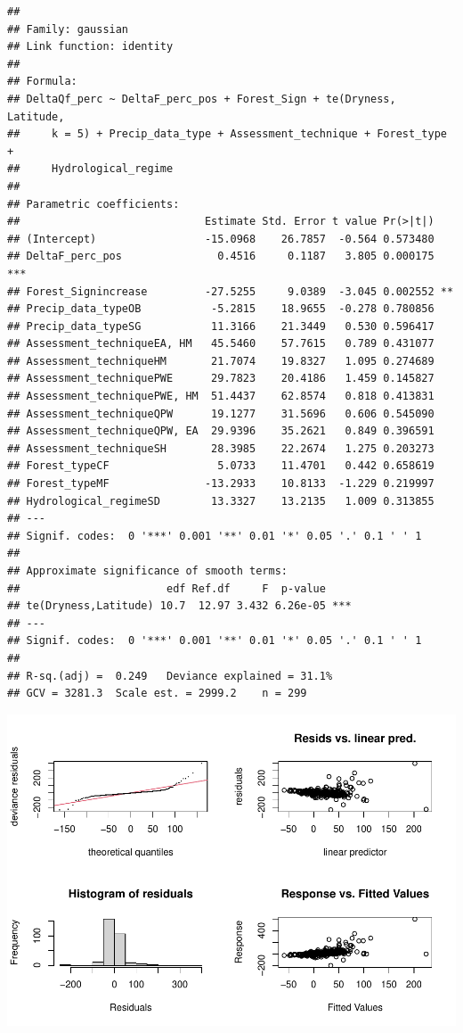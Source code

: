 \documentclass[]{elsarticle} %
\begin{document}
\begin{verbatim}
## 
## Family: gaussian 
## Link function: identity 
## 
## Formula:
## DeltaQf_perc ~ DeltaF_perc_pos + Forest_Sign + te(Dryness, Latitude, 
##     k = 5) + Precip_data_type + Assessment_technique + Forest_type + 
##     Hydrological_regime
## 
## Parametric coefficients:
##                             Estimate Std. Error t value Pr(>|t|)    
## (Intercept)                 -15.0968    26.7857  -0.564 0.573480    
## DeltaF_perc_pos               0.4516     0.1187   3.805 0.000175 ***
## Forest_Signincrease         -27.5255     9.0389  -3.045 0.002552 ** 
## Precip_data_typeOB           -5.2815    18.9655  -0.278 0.780856    
## Precip_data_typeSG           11.3166    21.3449   0.530 0.596417    
## Assessment_techniqueEA, HM   45.5460    57.7615   0.789 0.431077    
## Assessment_techniqueHM       21.7074    19.8327   1.095 0.274689    
## Assessment_techniquePWE      29.7823    20.4186   1.459 0.145827    
## Assessment_techniquePWE, HM  51.4437    62.8574   0.818 0.413831    
## Assessment_techniqueQPW      19.1277    31.5696   0.606 0.545090    
## Assessment_techniqueQPW, EA  29.9396    35.2621   0.849 0.396591    
## Assessment_techniqueSH       28.3985    22.2674   1.275 0.203273    
## Forest_typeCF                 5.0733    11.4701   0.442 0.658619    
## Forest_typeMF               -13.2933    10.8133  -1.229 0.219997    
## Hydrological_regimeSD        13.3327    13.2135   1.009 0.313855    
## ---
## Signif. codes:  0 '***' 0.001 '**' 0.01 '*' 0.05 '.' 0.1 ' ' 1
## 
## Approximate significance of smooth terms:
##                       edf Ref.df     F  p-value    
## te(Dryness,Latitude) 10.7  12.97 3.432 6.26e-05 ***
## ---
## Signif. codes:  0 '***' 0.001 '**' 0.01 '*' 0.05 '.' 0.1 ' ' 1
## 
## R-sq.(adj) =  0.249   Deviance explained = 31.1%
## GCV = 3281.3  Scale est. = 2999.2    n = 299
\end{verbatim}

\includegraphics{Forest_and_Water_files/figure-latex/model2c-1.pdf}
\end{document}

